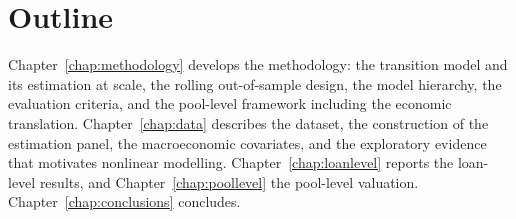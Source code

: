 \section{Outline}
\label{sec:intro-outline}

Chapter~\ref{chap:methodology} develops the methodology: the
transition model and its estimation at scale, the rolling
out-of-sample design, the model hierarchy, the evaluation criteria,
and the pool-level framework including the economic translation.
Chapter~\ref{chap:data} describes the dataset, the construction of
the estimation panel, the macroeconomic covariates, and the
exploratory evidence that motivates nonlinear modelling.
Chapter~\ref{chap:loanlevel} reports the loan-level results, and
Chapter~\ref{chap:poollevel} the pool-level valuation.
Chapter~\ref{chap:conclusions} concludes.
